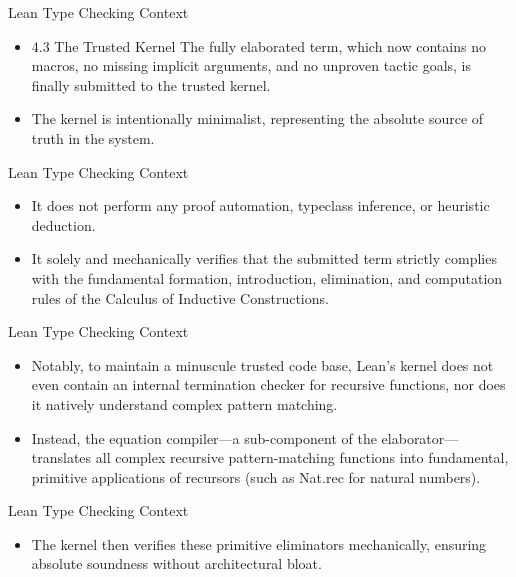 \documentclass[10pt]{beamer}
\begin{document}
\begin{frame}{Lean Type Checking Context}
\begin{itemize}\setlength{\itemsep}{1.5em}
  \item 4.3 The Trusted Kernel The fully elaborated term, which now contains no macros, no missing implicit arguments, and no unproven tactic goals, is finally submitted to the trusted kernel.
  \item The kernel is intentionally minimalist, representing the absolute source of truth in the system.
\end{itemize}
\end{frame}

\begin{frame}{Lean Type Checking Context}
\begin{itemize}\setlength{\itemsep}{1.5em}
  \item It does not perform any proof automation, typeclass inference, or heuristic deduction.
  \item It solely and mechanically verifies that the submitted term strictly complies with the fundamental formation, introduction, elimination, and computation rules of the Calculus of Inductive Constructions.
\end{itemize}
\end{frame}

\begin{frame}{Lean Type Checking Context}
\begin{itemize}\setlength{\itemsep}{1.5em}
  \item Notably, to maintain a minuscule trusted code base, Lean's kernel does not even contain an internal termination checker for recursive functions, nor does it natively understand complex pattern matching.
  \item Instead, the equation compiler—a sub-component of the elaborator—translates all complex recursive pattern-matching functions into fundamental, primitive applications of recursors (such as Nat.rec for natural numbers).
\end{itemize}
\end{frame}

\begin{frame}{Lean Type Checking Context}
\begin{itemize}\setlength{\itemsep}{1.5em}
  \item The kernel then verifies these primitive eliminators mechanically, ensuring absolute soundness without architectural bloat.
\end{itemize}
\end{frame}
\end{document}
